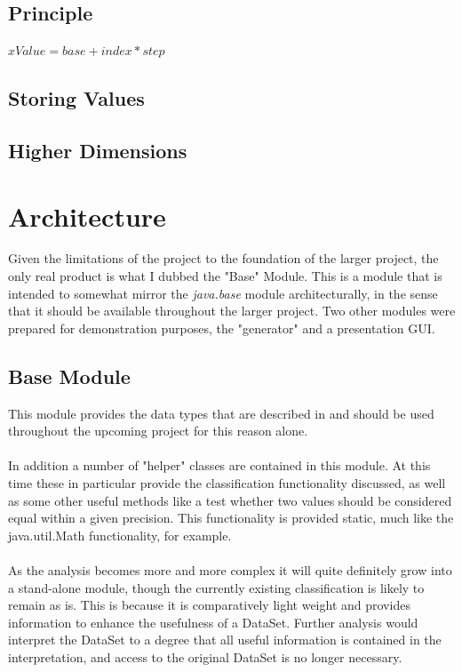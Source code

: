 \documentclass[main.tex]{subfiles}
\begin{document}
    \subsection{Principle}
      
      $xValue=base+index*step$
      
    \subsection{Storing Values}
      
      
      
    \subsection{Higher Dimensions}
      
      
      
  \section{Architecture}
    
    Given the limitations of the project to the foundation of the larger project, the only real product is what I dubbed the "Base" Module. This is a module that is intended to somewhat mirror the \textit{java.base} module architecturally, in the sense that it should be available throughout the larger project. Two other modules were prepared for demonstration purposes, the "generator" and a presentation  GUI.
    
    \subsection{Base Module}
      
      This module provides the data types that are described in  and should be used throughout the upcoming project for this reason alone. 
      \\\\
      In addition a number of "helper" classes are contained in this module. At this time these in particular provide the classification functionality discussed, as well as some other useful methods like a test whether two values should be considered equal within a given precision. This functionality is provided static, much like the java.util.Math functionality, for example.
      \\\\
      As the analysis becomes more and more complex it will quite definitely grow into a stand-alone module, though the currently existing classification is likely to remain as is. This is because it is comparatively light weight and provides information to enhance the usefulness of a DataSet. Further analysis would interpret the DataSet to a degree that all useful information is contained in the interpretation, and access to the original DataSet is no longer necessary.
      
\end{document}
